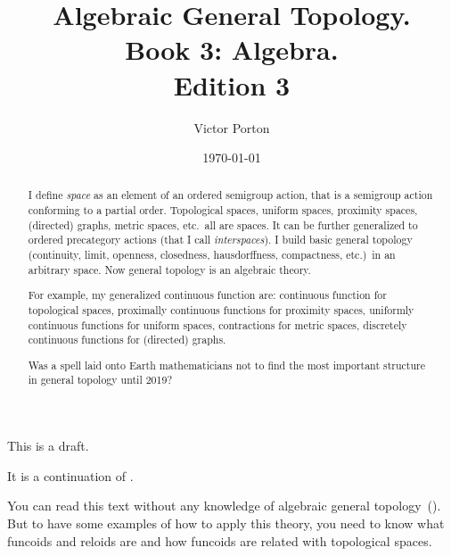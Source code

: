 \documentclass[english,reqno,12pt]{amsbook}
\begin{document}
\title{Algebraic General Topology.\\Book 3: Algebra.\\Edition 3}

\author{Victor Porton}



\date{\today}

\begin{abstract}
I define \emph{space} as an element of an ordered semigroup action, that is a semigroup action conforming to a partial order. Topological spaces, uniform spaces, proximity spaces, (directed) graphs, metric spaces, etc.\ all are spaces. It can be further generalized to ordered precategory actions (that I call \emph{interspaces}). I build basic general topology (continuity, limit, openness, closedness, hausdorffness, compactness, etc.)\ in an arbitrary space. Now general topology is an algebraic theory.

For example, my generalized continuous function are: continuous function for topological spaces, proximally continuous functions for proximity spaces, uniformly continuous functions for uniform spaces, contractions for metric spaces, discretely continuous functions for (directed) graphs.

Was a spell laid onto Earth mathematicians not to find the most important structure in general topology until 2019?
\end{abstract}





\maketitle

\tableofcontents{}

This is a draft.

It is a continuation of \cite{volume-1}.

You can read this text without any knowledge of algebraic general topology~(\cite{volume-1}). But to have some examples of how to apply this theory, you need to know what funcoids and reloids are and how funcoids are related with topological spaces.






\end{document}
